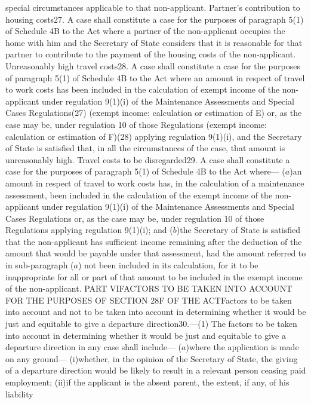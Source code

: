 \documentclass[a4paper]{article}
\begin{document}
special circumstances applicable to that non-applicant.
Partner’s contribution to housing costs27. A case shall constitute a case for
the purposes of paragraph 5(1) of Schedule 4B to the Act where a partner of the
non-applicant occupies the home with him and the Secretary of State considers
that it is reasonable for that partner to contribute to the payment of the
housing costs of the non-applicant.
Unreasonably high travel costs28. A case shall constitute a case for the
purposes of paragraph 5(1) of Schedule 4B to the Act where an amount in respect
of travel to work costs has been included in the calculation of exempt income of
the non-applicant under regulation 9(1)(i) of the Maintenance Assessments and
Special Cases Regulations(27) (exempt income: calculation or estimation of E)
or, as the case may be, under regulation 10 of those Regulations (exempt income:
calculation or estimation of F)(28) applying regulation 9(1)(i), and the
Secretary of State is satisfied that, in all the circumstances of the case, that
amount is unreasonably high.
Travel costs to be disregarded29. A case shall constitute a case for the
purposes of paragraph 5(1) of Schedule 4B to the Act where—
($a$)an amount in respect of travel to work costs has, in the calculation of a
maintenance assessment, been included in the calculation of the exempt income of
the non-applicant under regulation 9(1)(i) of the Maintenance Assessments and
Special Cases Regulations or, as the case may be, under regulation 10 of those
Regulations applying regulation 9(1)(i); and
($b$)the Secretary of State is satisfied that the non-applicant has sufficient
income remaining after the deduction of the amount that would be payable under
that assessment, had the amount referred to in sub-paragraph ($a$) not been
included in its calculation, for it to be inappropriate for all or part of that
amount to be included in the exempt income of the non-applicant.
PART VIFACTORS TO BE TAKEN INTO ACCOUNT FOR THE PURPOSES OF SECTION 28F OF THE
ACTFactors to be taken into account and not to be taken into account in
determining whether it would be just and equitable to give a departure
direction30.—(1) The factors to be taken into account in determining whether it
would be just and equitable to give a departure direction in any case shall
include—
($a$)where the application is made on any ground—
(i)whether, in the opinion of the Secretary of State, the giving of a departure
direction would be likely to result in a relevant person ceasing paid
employment;
(ii)if the applicant is the absent parent, the extent, if any, of his liability
\end{document}
